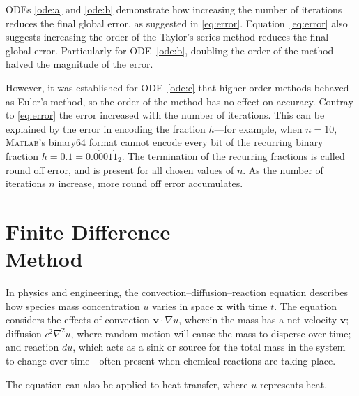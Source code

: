 \documentclass[a4paper,12pt,twocolumn]{article}
\begin{document}
ODEs \eqref{ode:a} and \eqref{ode:b} demonstrate how increasing the number of
iterations reduces the final global error, as suggested in \eqref{eq:error}.
Equation~\eqref{eq:error} also suggests increasing the order of the Taylor's
series method reduces the final global error. Particularly for
ODE~\eqref{ode:b}, doubling the order of the method halved the magnitude of the
error.

However, it was established for ODE~\eqref{ode:c} that higher order methods
behaved as Euler's method, so the order of the method has no effect on accuracy.
Contray to \eqref{eq:error} the error increased with the number of iterations.
This can be explained by the error in encoding the fraction $h$---for example,
when $n=10$, \textsc{Matlab}'s binary64 format cannot encode every bit of the
recurring binary fraction $h=0.1=0.0\dot{0}01\dot{1}_2$. The termination of the
recurring fractions is called round off error, and is present for all chosen
values of $n$. As the number of iterations $n$ increase, more round off error
accumulates.

\vspace{-\baselineskip}
\section{Finite Difference\\Method}

In physics and engineering, the convection--diffusion--reaction equation
describes how species mass concentration $u$ varies in space $\mathbf{x}$ with
time $t$. The equation considers the effects of convection
$\mathbf{v}\cdot\nabla u$, wherein the mass has a net velocity $\mathbf{v}$;
diffusion $c^2\nabla^2u$, where random motion will cause the mass to disperse
over time; and reaction $du$, which acts as a sink or source for the total mass
in the system to change over time---often present when chemical reactions are
taking place.

The equation can also be applied to heat transfer, where $u$ represents heat.
\end{document}
